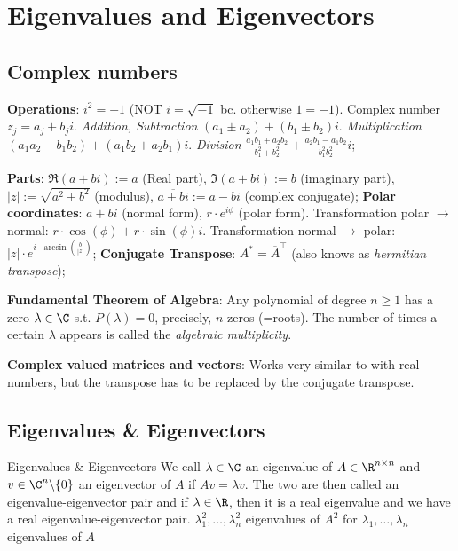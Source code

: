 \newsection
\section{Eigenvalues and Eigenvectors}
\setcounter{subsection}{-1}
\subsection{Complex numbers}
\textbf{Operations}: $i^2 = -1$ (NOT $i = \sqrt{-1}$ bc. otherwise $1 = -1$). Complex number $z_j = a_j + b_ji$. \textit{Addition, Subtraction} $(a_1 \pm a_2) + (b_1 \pm b_2)i$. \textit{Multiplication} $(a_1 a_2 - b_1 b_2) + (a_1 b_2 + a_2 b_1)i$. \textit{Division} $\displaystyle\frac{a_1 b_1 + a_2 b_2}{b_1^2 + b_2^2} + \frac{a_2 b_1 - a_1 b_2}{b_1^2 b_2^2}i$;

\textbf{Parts}: $\mathfrak{R}(a + bi) := a$ (Real part), $\mathfrak{I}(a + bi) := b$ (imaginary part), $|z| := \sqrt{a^2 + b^2}$ (modulus), $\overline{a + bi} := a-bi$ (complex conjugate);
\setcounter{all}{2}\shortfact\textbf{Polar coordinates}: $a + bi$ (normal form), $r \cdot e^{i \phi}$ (polar form). Transformation polar $\rightarrow$ normal: $r \cdot \cos(\phi) + r \cdot \sin(\phi)i$. Transformation normal $\rightarrow$ polar: $|z| \cdot e^{i \cdot \arcsin(\frac{b}{|z|})}$;
\textbf{Conjugate Transpose}: $A^* = \overline{A}^{\top}$ (also knows as \textit{hermitian transpose});

\shorttheorem \textbf{Fundamental Theorem of Algebra}: Any polynomial of degree $n \geq 1$ has a zero $\lambda \in \C$ s.t. $P(\lambda) = 0$, precisely, $n$ zeros (=roots). The number of times a certain $\lambda$ appears is called the \textit{algebraic multiplicity}.

\textbf{Complex valued matrices and vectors}: Works very similar to with real numbers, but the transpose has to be replaced by the conjugate transpose.


\newsectionNoPB
\subsection{Eigenvalues \& Eigenvectors}
\begin{definition}[]{Eigenvalues \& Eigenvectors}
    We call $\lambda \in \C$ an eigenvalue of $A \in \R^{n\times n}$ and $v \in \C^n\backslash\{0\}$ an eigenvector of $A$ if $Av = \lambda v$. 
    The two are then called an eigenvalue-eigenvector pair and if $\lambda \in \R$, then it is a real eigenvalue and we have a real eigenvalue-eigenvector pair.
    $\lambda_1^2, \ldots, \lambda_n^2$ eigenvalues of $A^2$ for $\lambda_1, \ldots, \lambda_n$ eigenvalues of $A$
\end{definition}

